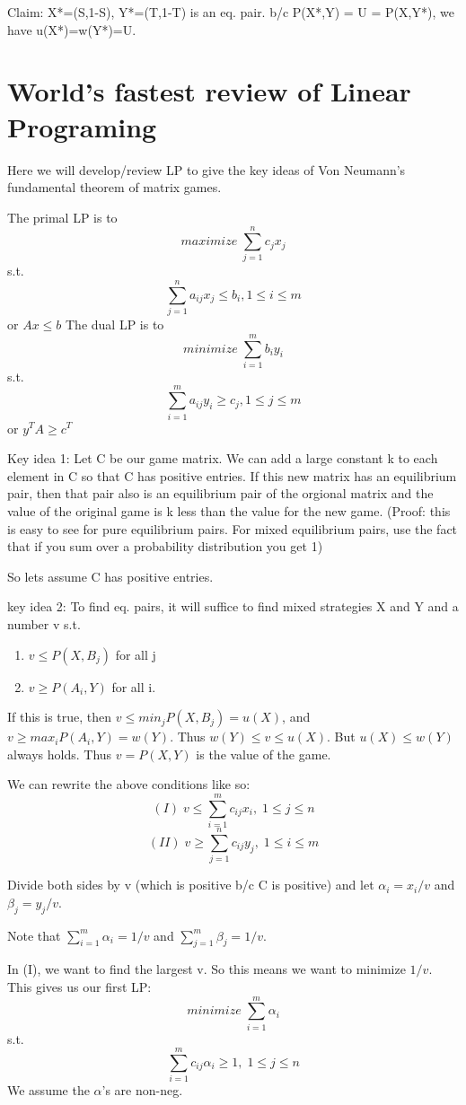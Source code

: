 Claim: X*=(S,1-S), Y*=(T,1-T) is an eq. pair. b/c P(X*,Y) = U = P(X,Y*), we have u(X*)=w(Y*)=U.

\section{World's fastest review of Linear Programing}
Here we will develop/review LP to give the key ideas of Von Neumann's  fundamental theorem of matrix games.

The primal LP is to
\[maximize \; \sum_{j=1}^n c_jx_j\]
s.t.
\[ \sum_{j=1}^n a_{ij}x_j \leq b_i, 1 \leq i \leq m\]
or $Ax \leq b$
The dual LP is to 
\[minimize\; \sum_{i=1}^m b_iy_i\]
s.t.
\[ \sum_{i=1}^m a_{ij}y_i \geq c_j, 1 \leq j \leq m\]
or $y^TA \geq c^T$

Key idea 1: Let C be our game matrix. We can add a large constant k to each element in C so that C has positive entries. If this new matrix has an equilibrium pair, then that pair also is an equilibrium pair of the orgional matrix and the value of the original game is k less than the value for the new game. (Proof: this is easy to see for pure equilibrium pairs. For mixed equilibrium pairs, use the fact that if you sum over a probability distribution you get 1)

So lets assume C has positive entries.

key idea 2: To find eq. pairs, it will suffice to find mixed strategies X and Y and a number v s.t.
\begin{enumerate}
	\item $v \leq P(X,B_j)$ for all j
	\item $v \geq P(A_i,Y)$ for all i. 
\end{enumerate}

If this is true, then $v \leq min_j P(X,B_j) = u(X)$, and $v \geq max_i P(A_i,Y) = w(Y)$. Thus $w(Y) \leq v \leq u(X)$. But $u(X) \leq w(Y)$ always holds. Thus $v = P(X,Y)$ is the value of the game.

We can rewrite the above conditions like so:
\[(I)\; v \leq \sum_{i=1}^m c_{ij}x_i, \; 1 \leq j \leq n\]
\[(II)\; v \geq \sum_{j=1}^n c_{ij}y_j,\; 1 \leq i \leq m\]

Divide both sides by v (which is positive b/c C is positive) and let $\alpha_i = x_i/v$ and $\beta_j=y_j/v$. 

Note that $\sum_{i=1}^m \alpha_i = 1/v$ and $\sum_{j=1}^m \beta_j = 1/v.$

In (I), we want to find the largest v. So this means we want to minimize $1/v$. This gives us our first LP:
\[ minimize\; \sum_{i=1}^m \alpha_i\]
s.t.
\[ \sum_{i=1}^m c_{ij}\alpha_i \geq 1,\; 1 \leq j \leq n\]
We assume the $\alpha$'s are non-neg.

